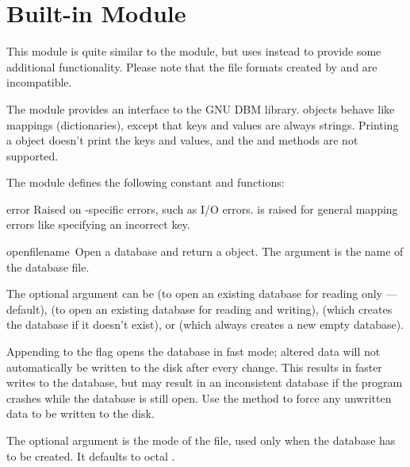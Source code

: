 \section{Built-in Module }
\label{module-gdbm}

This module is quite similar to the  module, but uses 
instead to provide some additional functionality.  Please note that
the file formats created by  and  are incompatible.

The  module provides an interface to the GNU DBM
library.   objects behave like mappings
(dictionaries), except that keys and values are always strings.
Printing a  object doesn't print the keys and values, and the
 and  methods are not supported.

The module defines the following constant and functions:

\begin{excdesc}{error}
Raised on -specific errors, such as I/O errors.  is
raised for general mapping errors like specifying an incorrect key.
\end{excdesc}

\begin{funcdesc}{open}{filename\, }
Open a  database and return a  object.  The
 argument is the name of the database file.

The optional  argument can be
 (to open an existing database for reading only --- default),
 (to open an existing database for reading and writing),
 (which creates the database if it doesn't exist), or
 (which always creates a new empty database).

Appending  to the flag opens the database in fast mode;
altered data will not automatically be written to the disk after every
change.  This results in faster writes to the database, but may result
in an inconsistent database if the program crashes while the database
is still open.  Use the  method to force any unwritten
data to be written to the disk.

The optional  argument is the \UNIX{} mode of the file, used
only when the database has to be created.  It defaults to octal
.
\end{funcdesc}

